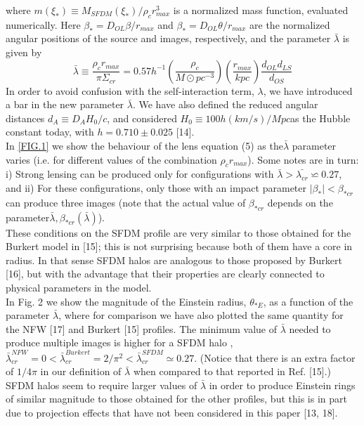 \documentclass[letterpaper,10pt]{article}
\begin{document}
\begin{multicols}{2}
{where $m(\xi_{\ast}) \equiv M_{SFDM}(\xi_{\ast})/\rho_{c}r_{max}^3$ is a normalized mass function, evaluated numerically. Here $\beta_{\ast} = D_{OL}\beta/r_{max}$ and $\beta_{\ast} = D_{OL}\theta/r_{max}$ are the normalized angular positions of the source and images, respectively, and the parameter $\bar{\lambda}$ is given by 
\begin{equation}
\tag{5b}
\label{eq:4.b}
\bar{\lambda} \equiv \frac{\rho_{c}r_{max}}{\pi \Sigma_{cr}} = 0.57 h^{-1}  \left( \frac{\rho_c}{M\odot pc^{-3}}  \right) \left (\frac{r_{max}}{kpc}  \right) \frac{d_{OL} d_{LS}}{d_{OS}}
\end{equation}
In order to avoid confusion with the self-interaction term, $\lambda$, we have introduced a bar in the new parameter $\bar{\lambda}$. We have also defined the reduced angular distances $d_{A} \equiv D_{A}H_{0}/c$, and considered $H_{0} \equiv 100h(km/s)/Mpc $as the Hubble constant today, with $h = 0.710 \pm 0.025$ [14].
\\
In \ref{FIG.1} we show the behaviour of the lens equation (5) as the$ \bar{\lambda}$ parameter varies (i.e. for different values of the combination $\rho_{c}r_{max}$). Some notes are in turn: i) Strong lensing can be produced only for configurations with $\bar{\lambda} >  \bar{\lambda_{cr}} \backsimeq 0.27$, and ii) For these configurations, only those with an impact parameter $\vert \beta_{\ast} \vert < \beta_{\ast cr} $ can produce three images (note that the actual value of $\beta_{\ast cr}$ depends on the parameter$\bar{\lambda}, \beta_{\ast cr}(\bar{\lambda}) $).
\\
These conditions on the SFDM profile are very similar to those obtained for the Burkert model in [15]; this is not surprising because both of them have a core in radius. In that sense SFDM halos are analogous to those proposed by Burkert [16], but with the advantage that their properties are clearly connected to physical parameters in the model.
\\
In Fig. 2 we show the magnitude of the Einstein radius, $\theta_{\ast E}$, as a function of the parameter $\bar{\lambda}$, where for comparison we have also plotted the same quantity for the NFW [17] and Burkert [15] profiles. The minimum value of $\bar{\lambda}$ needed to produce multiple images is higher for a SFDM halo ,$\bar{\lambda}_{cr}^{NFW} = 0 < \bar{\lambda}^{Burkert}_{cr} = 2/\pi^2 < \bar{\lambda}_{cr}^{SFDM} \simeq 0.27$. (Notice that there is an extra factor of $1/4\pi$ in our definition of $\bar{\lambda}$ when compared to that reported in Ref. [15].) SFDM halos seem to require larger values of $\bar{\lambda}$ in order to produce Einstein rings of similar magnitude to those obtained for the other profiles, but this is in part due to projection effects that have not been considered in this paper [13, 18].
 \\
 
}
\end{multicols}
\end{document}
